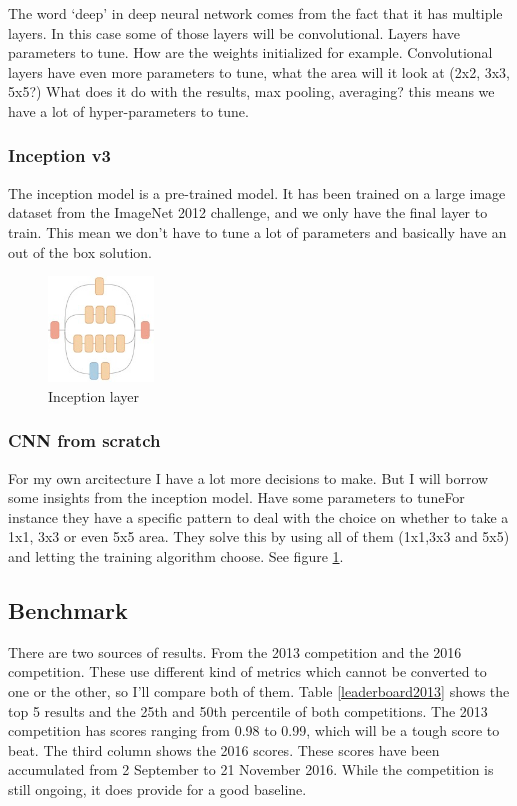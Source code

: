 \documentclass[11pt]{article}
\begin{document}
The word `deep' in deep neural network comes from the fact that it has multiple layers. In this case some of those layers will be convolutional. Layers have parameters to tune. How are the weights initialized for example. Convolutional layers have even more parameters to tune, what the area will it look at (2x2, 3x3, 5x5?) What does it do with the results, max pooling, averaging? this means we have a lot of hyper-parameters to tune. 	

\subsubsection{Inception v3}
The inception model is a pre-trained model. It has been trained on a large image dataset from the ImageNet 2012 challenge, and we only have the final layer to train. This mean we don't have to tune a lot of parameters and basically have an out of the box solution.

\begin{figure}
    \centering
    \includegraphics[width=0.25\textwidth]{images/inception-layer}
    \caption{Inception layer}
    \label{fig:inceptionlayer}
\end{figure}

\subsubsection{CNN from scratch}
For my own arcitecture I have a lot more decisions to make. But I will borrow some insights from the inception model. Have some parameters to tuneFor instance they have a specific pattern to deal with the choice on whether to take a 1x1, 3x3 or even 5x5 area. They solve this by using all of them (1x1,3x3 and 5x5) and letting the training algorithm choose. See figure \ref{fig:inceptionlayer}.


\subsection{Benchmark}
There are two sources of results. From the 2013 competition and the 2016 competition. These use different kind of metrics which cannot be converted to one or the other, so I'll compare both of them. Table \ref{leaderboard2013} shows the top 5 results and the 25th and 50th percentile of both competitions. The 2013 competition has scores ranging from 0.98 to 0.99, which will be a tough score to beat. The third column shows the 2016 scores. These scores have been accumulated from 2 September to 21 November 2016. While the competition is still ongoing, it does provide for a good baseline.
\end{document}
